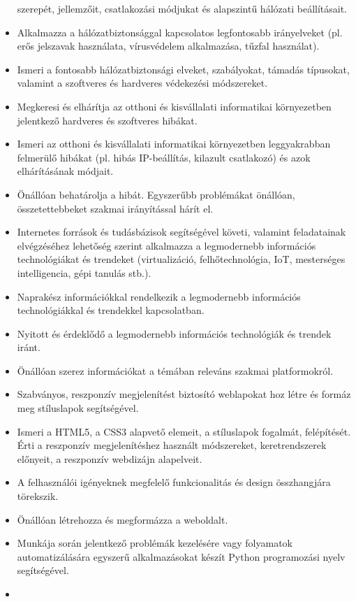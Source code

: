 \begin{itemize}
  szerepét, jellemzőit, csatlakozási módjukat és alapszintű hálózati
  beállításait.
\item
  Alkalmazza a hálózatbiztonsággal kapcsolatos legfontosabb irányelveket
  (pl. erős jelszavak használata, vírusvédelem alkalmazása, tűzfal
  használat).
\item
  Ismeri a fontosabb hálózatbiztonsági elveket, szabályokat, támadás
  típusokat, valamint a szoftveres és hardveres védekezési módszereket.
\item
  Megkeresi és elhárítja az otthoni és kisvállalati informatikai
  környezetben jelentkező hardveres és szoftveres hibákat.
\item
  Ismeri az otthoni és kisvállalati informatikai környezetben
  leggyakrabban felmerülő hibákat (pl. hibás IP-beállítás, kilazult
  csatlakozó) és azok elhárításának módjait.
\item
  Önállóan behatárolja a hibát. Egyszerűbb problémákat önállóan,
  összetettebbeket szakmai irányítással hárít el.
\item
  Internetes források és tudásbázisok segítségével követi, valamint
  feladatainak elvégzéséhez lehetőség szerint alkalmazza a legmodernebb
  információs technológiákat és trendeket (virtualizáció,
  felhőtechnológia, IoT, mesterséges intelligencia, gépi tanulás stb.).
\item
  Naprakész információkkal rendelkezik a legmodernebb információs
  technológiákkal és trendekkel kapcsolatban.
\item
  Nyitott és érdeklődő a legmodernebb információs technológiák és
  trendek iránt.
\item
  Önállóan szerez információkat a témában releváns szakmai
  platformokról.
\item
  Szabványos, reszponzív megjelenítést biztosító weblapokat hoz létre és
  formáz meg stíluslapok segítségével.
\item
  Ismeri a HTML5, a CSS3 alapvető elemeit, a stíluslapok fogalmát,
  felépítését. Érti a reszponzív megjelenítéshez használt módszereket,
  keretrendszerek előnyeit, a reszponzív webdizájn alapelveit.
\item
  A felhasználói igényeknek megfelelő funkcionalitás és design
  összhangjára törekszik.
\item
  Önállóan létrehozza és megformázza a weboldalt.
\item
  Munkája során jelentkező problémák kezelésére vagy folyamatok
  automatizálására egyszerű alkalmazásokat készít Python programozási
  nyelv segítségével.
\item

\end{itemize}

